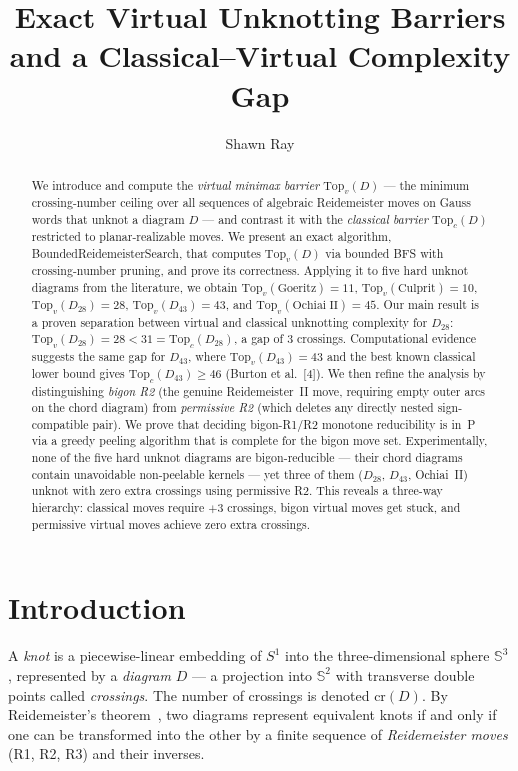 \documentclass[a4paper,UKenglish,cleveref,autoref]{lipics-v2021}
\title{Exact Virtual Unknotting Barriers and a Classical--Virtual Complexity Gap}
\author{Shawn Ray}{School of Computer Science, Carnegie Mellon University, Pittsburgh, USA}{shawnray@cmu.edu}{}{}
\newcommand{\BRS}{\textsf{Bounded\-Reide\-meister\-Search}\xspace}
\begin{document}
\maketitle

\begin{abstract}
We introduce and compute the \emph{virtual minimax barrier} $\mathrm{Top}_v(D)$ --- the minimum crossing-number ceiling over all sequences of algebraic Reidemeister moves on Gauss words that unknot a diagram $D$ --- and contrast it with the \emph{classical barrier} $\mathrm{Top}_c(D)$ restricted to planar-realizable moves.
We present an exact algorithm, \BRS, that computes $\mathrm{Top}_v(D)$ via bounded BFS with crossing-number pruning, and prove its correctness.
Applying it to five hard unknot diagrams from the literature, we obtain $\mathrm{Top}_v(\mathrm{Goeritz}) = 11$, $\mathrm{Top}_v(\mathrm{Culprit}) = 10$, $\mathrm{Top}_v(D_{28}) = 28$, $\mathrm{Top}_v(D_{43}) = 43$, and $\mathrm{Top}_v(\mathrm{Ochiai\;II}) = 45$.
Our main result is a proven separation between virtual and classical unknotting complexity for $D_{28}$: $\mathrm{Top}_v(D_{28}) = 28 < 31 = \mathrm{Top}_c(D_{28})$, a gap of $3$ crossings.
Computational evidence suggests the same gap for $D_{43}$, where $\mathrm{Top}_v(D_{43}) = 43$ and the best known classical lower bound gives $\mathrm{Top}_c(D_{43}) \geq 46$ (Burton et al.\ [4]).
We then refine the analysis by distinguishing \emph{bigon R2} (the genuine Reidemeister~II move, requiring empty outer arcs on the chord diagram) from \emph{permissive R2} (which deletes any directly nested sign-compatible pair).
We prove that deciding bigon-R1/R2 monotone reducibility is in~P via a greedy peeling algorithm that is complete for the bigon move set.
Experimentally, none of the five hard unknot diagrams are bigon-reducible --- their chord diagrams contain unavoidable non-peelable kernels --- yet three of them ($D_{28}$, $D_{43}$, Ochiai~II) unknot with zero extra crossings using permissive R2.
This reveals a three-way hierarchy: classical moves require $+3$ crossings, bigon virtual moves get stuck, and permissive virtual moves achieve zero extra crossings.
\end{abstract}


\section{Introduction}

A \emph{knot} is a piecewise-linear embedding of $S^1$ into the three-dimensional sphere $\mathbb{S}^3$, represented by a \emph{diagram} $D$ --- a projection into $\mathbb{S}^2$ with transverse double points called \emph{crossings}.
The number of crossings is denoted $\mathrm{cr}(D)$.
By Reidemeister's theorem~\cite{Reidemeister27}, two diagrams represent equivalent knots if and only if one can be transformed into the other by a finite sequence of \emph{Reidemeister moves} (R1, R2, R3) and their inverses.
\end{document}
